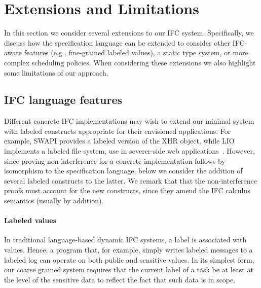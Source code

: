 \section{Extensions and Limitations}
\label{sec:extensions}

In this section we consider several extensions to our IFC system.
%
Specifically, we discuss how the specification language can be
extended to consider other IFC-aware features (e.g., fine-grained
labeled values), a static type system, or more complex scheduling
policies.
%
When considering these extensions we also highlight some limitations
of our approach.

\subsection{IFC language features}
\label{sec:extensions:labeled}

Different concrete IFC implementations may wish to extend our minimal
system with labeled constructs appropriate for their envisioned
applications.
%
For example, SWAPI provides a labeled version of the XHR object, while
LIO implements a labeled file system, use in severer-side web
applications~\cite{hails}.
%
However, since proving non-interference for a concrete implementation
follows by isomorphism to the specification language, below we
consider the addition of several labeled constructs to the latter.
%
We remark that that the non-interference proofs must account for the
new constructs, since they amend the IFC calculus semantics (usually
by addition).

\paragraph{Labeled values}
In traditional language-based dynamic IFC systems, a label is
associated with values.
%
Hence, a program that, for example, simply writes labeled messages to
a labeled log can operate on both public and sensitive values.
%
In its simplest form, our coarse grained system requires that the
current label of a task be at least at the level of the sensitive data
to reflect the fact that such data is in scope.
 
